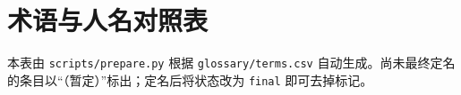 \chapter*{术语与人名对照表}

本表由 \texttt{scripts/prepare.py} 根据 \texttt{glossary/terms.csv} 自动生成。尚未最终定名的条目以“（暂定）”标出；定名后将状态改为 \texttt{final} 即可去掉标记。

\vspace{0.8em}

